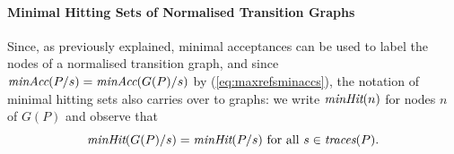 \paragraph{Minimal Hitting Sets of Normalised Transition Graphs} Since, as
previously explained, minimal acceptances can be used to label the nodes of a
normalised transition graph, and since $\text{\it minAcc}(P/s) = \text{\it minAcc}(G(P)/s)$ by
(\ref{eq:maxrefsminaccs}), the notation of minimal hitting sets also carries
over to graphs: we write $\text{\it minHit}(n)$ for nodes $n$ of $G(P)$ and observe
that
\begin{equation}
\label{eq:minhitsGP}
\text{\it minHit}(G(P)/s) = \text{\it minHit}(P/s) \ \text{for all}\ s\in \text{\it traces}(P).
\end{equation}

